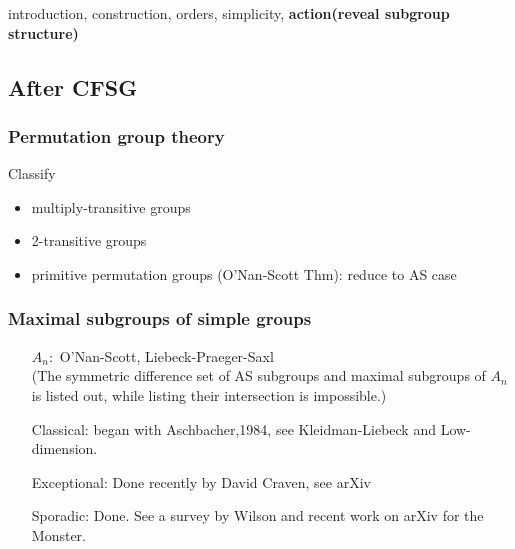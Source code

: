 \documentclass[a4paper,11pt]{article}
\begin{document}
introduction, construction, orders, simplicity, \textbf{action(reveal subgroup structure)}

\newpage
\subsection{After CFSG}
\subsubsection{Permutation group theory}

Classify
\begin{itemize}
	\item multiply-transitive groups
	\item 2-transitive groups
	\item primitive permutation groups (O'Nan-Scott Thm): reduce to AS case
\end{itemize}



\subsubsection{Maximal subgroups of simple groups}

\begin{itemize}
	\item[$A_n:$] O'Nan-Scott, Liebeck-Praeger-Saxl \\(The symmetric difference set of AS subgroups and maximal subgroups of $A_n$ is listed out, while listing their intersection is impossible.)
	\item[Classical:] began with Aschbacher,1984, see Kleidman-Liebeck and Low-dimension.
	\item[Exceptional:] Done recently by David Craven, see arXiv
	\item[Sporadic:] Done. See a survey by Wilson and recent work on arXiv for the Monster.
\end{itemize}

\ifx\ChapOne\undefined
     
\end{document}
